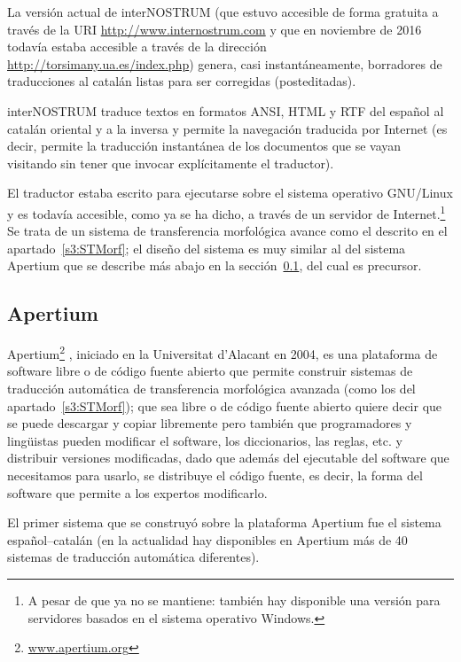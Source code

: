 La versión actual de {\sf interNOSTRUM} (que estuvo accesible de forma gratuita a través de la URI \url{http://www.internostrum.com} y que en noviembre de 2016 todavía estaba accesible a través de la dirección \url{http://torsimany.ua.es/index.php}) genera, casi instantáneamente, borradores de traducciones al catalán listas para ser corregidas (posteditadas). 

{\sf interNOSTRUM} traduce textos en formatos ANSI, HTML y RTF del español al catalán oriental y a la inversa y permite la navegación traducida por Internet (es decir, permite la traducción instantánea de los documentos que se vayan visitando sin tener que invocar explícitamente el traductor). 

El traductor estaba escrito para ejecutarse sobre el sistema operativo GNU/Linux y es todavía accesible, como ya se ha dicho, a través de un servidor de Internet.\footnote{A pesar de que ya no se mantiene: también hay disponible una versión para servidores basados en el sistema operativo Windows.} Se trata de un sistema de transferencia morfológica avance como el descrito en el apartado~\ref{s3:STMorf}; el diseño del sistema es muy similar al del sistema Apertium que se describe más abajo en la sección~\ref{ss:apertium}, del cual es precursor. 

\subsection{Apertium} \label{ss:apertium} 

Apertium\footnote{\url{www.apertium.org}} \citep{forcada2011apertium}, iniciado en la Universitat d'Alacant en 2004, es una plataforma de software libre o de código fuente abierto que permite construir sistemas de traducción automática de transferencia morfológica avanzada (como los del apartado~\ref{s3:STMorf}); que sea libre o de código fuente abierto quiere decir que se puede descargar y copiar libremente pero también que programadores y lingüistas pueden modificar el software, los diccionarios, las reglas, etc. y distribuir versiones modificadas, dado que además del ejecutable del software que necesitamos para usarlo, se  distribuye el código fuente, es decir, la forma del software que permite a los expertos modificarlo. 

El primer sistema que se construyó sobre la plataforma Apertium fue el sistema español--catalán (en la actualidad hay disponibles en Apertium más de 40 sistemas de traducción automática diferentes). 

